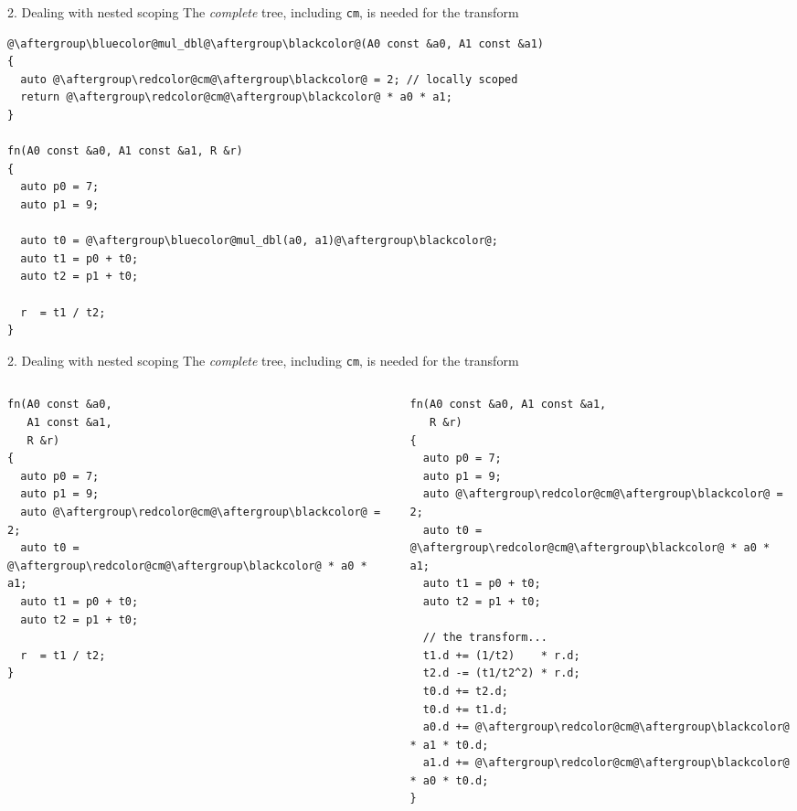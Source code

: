 \documentclass[xcolor=dvipsnames]{beamer}
\begin{document}
\begin{frame}[fragile]{2. Dealing with nested scoping}
The \emph{complete} tree, including {\color{red}\texttt{cm}}, is needed for the transform

      \begin{lstlisting}
@\aftergroup\bluecolor@mul_dbl@\aftergroup\blackcolor@(A0 const &a0, A1 const &a1)
{
  auto @\aftergroup\redcolor@cm@\aftergroup\blackcolor@ = 2; // locally scoped
  return @\aftergroup\redcolor@cm@\aftergroup\blackcolor@ * a0 * a1;
}

fn(A0 const &a0, A1 const &a1, R &r)
{
  auto p0 = 7;
  auto p1 = 9;

  auto t0 = @\aftergroup\bluecolor@mul_dbl(a0, a1)@\aftergroup\blackcolor@;
  auto t1 = p0 + t0;
  auto t2 = p1 + t0;

  r  = t1 / t2;
}
  \end{lstlisting}
\end{frame}


\begin{frame}[fragile]{2. Dealing with nested scoping}
The \emph{complete} tree, including {\color{red}\texttt{cm}}, is needed for the transform
  \begin{columns}[T] %
    \begin{column}{0.44\textwidth}
      \begin{lstlisting}
fn(A0 const &a0,
   A1 const &a1,
   R &r)
{
  auto p0 = 7;
  auto p1 = 9;
  auto @\aftergroup\redcolor@cm@\aftergroup\blackcolor@ = 2;
  auto t0 = @\aftergroup\redcolor@cm@\aftergroup\blackcolor@ * a0 * a1;
  auto t1 = p0 + t0;
  auto t2 = p1 + t0;

  r  = t1 / t2;
}
  \end{lstlisting}
    \end{column}%
    \hfill%
    \begin{column}{0.56\textwidth}
        \begin{lstlisting}
fn(A0 const &a0, A1 const &a1,
   R &r)
{
  auto p0 = 7;
  auto p1 = 9;
  auto @\aftergroup\redcolor@cm@\aftergroup\blackcolor@ = 2;
  auto t0 = @\aftergroup\redcolor@cm@\aftergroup\blackcolor@ * a0 * a1;
  auto t1 = p0 + t0;
  auto t2 = p1 + t0;

  // the transform...
  t1.d += (1/t2)    * r.d;
  t2.d -= (t1/t2^2) * r.d;
  t0.d += t2.d;
  t0.d += t1.d;
  a0.d += @\aftergroup\redcolor@cm@\aftergroup\blackcolor@ * a1 * t0.d;
  a1.d += @\aftergroup\redcolor@cm@\aftergroup\blackcolor@ * a0 * t0.d;
}
  \end{lstlisting}
    \end{column}%
  \end{columns}
\end{frame}
\end{document}
